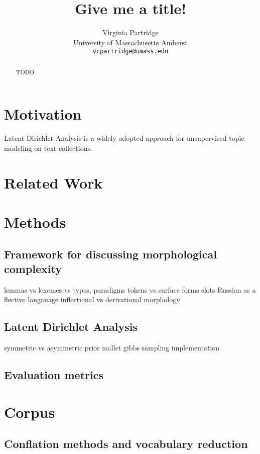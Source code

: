 \documentclass[11pt,a4paper]{article}
\title{Give me a title!}
\author{Virginia Partridge \\
  University of Massachusetts Amherst\\
  \texttt{vcpartridge@umass.edu}
}
\date{}
\begin{document}
\maketitle
\begin{abstract}
TODO
\end{abstract}

\section{Motivation}
Latent Dirichlet Analysis is a widely adopted approach for unsupervised topic modeling on text collections.
\section{Related Work}

\section{Methods}
\subsection{Framework for discussing morphological complexity}
lemmas vs lexemes vs types, paradigms
tokens vs surface forms
slots
Russian as a flective langauage
inflectional vs derivational morphology

\subsection{Latent Dirichlet Analysis}
symmetric vs asymmetric prior
mallet gibbs sampling implementation

\subsection{Evaluation metrics}

\section{Corpus}
\subsection{Conflation methods and vocabulary reduction}
\end{document}
